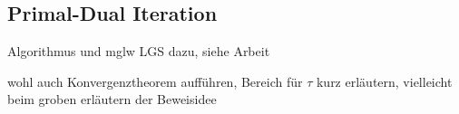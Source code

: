\subsection{Primal-Dual Iteration}
\begin{frame}
  Algorithmus und mglw LGS dazu, siehe Arbeit

  wohl auch Konvergenztheorem aufführen, Bereich für $\tau$ kurz erläutern,
  vielleicht beim groben erläutern der Beweisidee
\end{frame}
